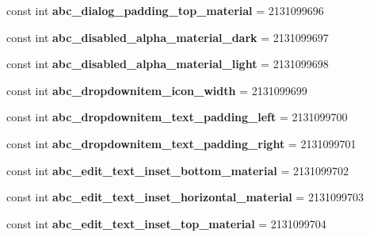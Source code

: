 \begin{DoxyCompactItemize}
const int {\bfseries abc\+\_\+dialog\+\_\+padding\+\_\+top\+\_\+material} = 2131099696
\item 
\mbox{\label{classXaria_1_1Resource_1_1Dimension_a2d16b63676b478610b16fb1ee8c2bee8}} 
const int {\bfseries abc\+\_\+disabled\+\_\+alpha\+\_\+material\+\_\+dark} = 2131099697
\item 
\mbox{\label{classXaria_1_1Resource_1_1Dimension_af58cd11b10938c6e7451b656507f746a}} 
const int {\bfseries abc\+\_\+disabled\+\_\+alpha\+\_\+material\+\_\+light} = 2131099698
\item 
\mbox{\label{classXaria_1_1Resource_1_1Dimension_a0b9ee8558d6b73f4827e3d3478d27eeb}} 
const int {\bfseries abc\+\_\+dropdownitem\+\_\+icon\+\_\+width} = 2131099699
\item 
\mbox{\label{classXaria_1_1Resource_1_1Dimension_ac2f9f9f0bfae02d2906700fb7062e273}} 
const int {\bfseries abc\+\_\+dropdownitem\+\_\+text\+\_\+padding\+\_\+left} = 2131099700
\item 
\mbox{\label{classXaria_1_1Resource_1_1Dimension_aea10e8919431ba34a4c258a7a06004b6}} 
const int {\bfseries abc\+\_\+dropdownitem\+\_\+text\+\_\+padding\+\_\+right} = 2131099701
\item 
\mbox{\label{classXaria_1_1Resource_1_1Dimension_ace8a3cd992802669fc71720735bf4f3c}} 
const int {\bfseries abc\+\_\+edit\+\_\+text\+\_\+inset\+\_\+bottom\+\_\+material} = 2131099702
\item 
\mbox{\label{classXaria_1_1Resource_1_1Dimension_abeb28ac79a1c806275f6967e5f9c6a69}} 
const int {\bfseries abc\+\_\+edit\+\_\+text\+\_\+inset\+\_\+horizontal\+\_\+material} = 2131099703
\item 
\mbox{\label{classXaria_1_1Resource_1_1Dimension_a2b7008fb57e2cb9e9ca77a29c7d957ae}} 
const int {\bfseries abc\+\_\+edit\+\_\+text\+\_\+inset\+\_\+top\+\_\+material} = 2131099704
\item 
\mbox{\label{classXaria_1_1Resource_1_1Dimension_a83774c2b685f7b6dcefcd30caf037ba1}} 

\end{DoxyCompactItemize}
